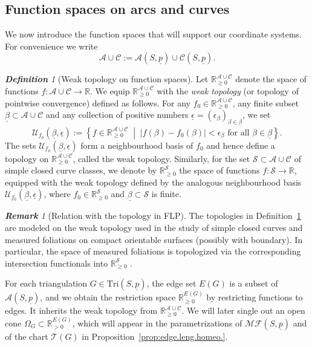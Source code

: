 \documentclass[11pt, letterpaper]{amsart}
\theoremstyle{definition}
\theoremstyle{remark}
\newtheorem{definition}[theorem]{\rm\bf Definition}
\newtheorem{remark}[theorem]{\rm\bf Remark}
\newcommand{\up}{\underline{p}}
\newcommand{\Sp}{(S,\up)}
\newcommand{\TSp}{\text{Tri}\Sp}
\newcommand{\cMFp}{\mathcal{MF} (S,\up)}
\newcommand{\cC}{\mathcal{C}}
\newcommand{\cA}{\mathcal{A}}
\newcommand{\cAC}{\mathcal{A} \cup \mathcal{C}}
\newcommand{\cT}{\mathcal{T}}
\newcommand{\cU}{\mathcal{U}}
\newcommand{\bR}{\mathbb{R}}
\newcommand{\bRn}{\mathbb{R}_{\geq 0}}
\newcommand{\bRp}{\mathbb{R}_{> 0}}
\newcommand{\cS}{\mathcal{S}}
\newcommand{\DEF}{} \newcommand{\WARN}{\textcolor{red}} \newcommand{\ALT}{\textcolor{brown}} \newcommand{\TODO}{\textcolor{teal}} %
\numberwithin{equation}{section}
\begin{document}
 
\subsection{Function spaces on arcs and curves}

We now introduce the function spaces that will support our coordinate systems.
For convenience we write
\[
  \cAC := \cA\Sp \cup \cC\Sp.
\]



\begin{definition}[Weak topology on function spaces]
\label{def:weak.top.func.space}
Let \(\bRn^{\cAC}\) denote the space of functions \(f \colon \cAC \to \bR\).
We equip \(\bRn^{\cAC}\) with the \DEF{\em weak topology} (or topology of pointwise convergence) defined as follows.
For any \(f_0 \in \bRn^{\cAC}\), any finite subset \(\underline{\beta} \subset \cAC\) and any collection of positive numbers \(\underline{\epsilon} = (\epsilon_{\beta})_{\beta \in \underline{\beta}}\), we set
\[
  \cU_{f_0}(\underline{\beta}, \underline{\epsilon})
  :=
  \left\{
    f \in \bRn^{\cAC}
    \;\middle|\;
    \lvert f(\beta) - f_0(\beta) \rvert < \epsilon_{\beta}
    \text{ for all } \beta \in \underline{\beta}
  \right\}.
\]
The sets \(\cU_{f_0}(\underline{\beta}, \underline{\epsilon})\) form a neighbourhood basis of \(f_0\) and hence define a topology on \(\bRn^{\cAC}\), called the weak topology.
Similarly, for the set \(\cS\subset \cAC\) of simple closed curve classes,  we denote by \(\bRn^{\cS}\) the space of functions \(f:\cS\to\bR\),
equipped with the weak topology defined by the analogous neighbourhood basis
\(\cU_{f_0}(\underline{\beta},\underline{\epsilon})\), where \(f_0\in\bR^{\cS}_{\geq 0}\) and \(\underline{\beta}\subset\cS\) is finite.
\end{definition}





\begin{remark}[Relation with the topology in FLP]
The topologies in Definition~\ref{def:weak.top.func.space} are modeled on the weak topology used in the study of simple closed curves and measured foliations on compact orientable surfaces (possibly with boundary). 
In particular, the space of measured foliations is topologized via the corresponding intersection functionals into \(\bRn^{\cS}\) \cite[Expos\'e~4]{FLP12}.
\end{remark}





For each triangulation \(G \in \TSp\), the edge set \(E(G)\) is a subset of \(\cA\Sp\), and we obtain the restriction space \(\bRn^{E(G)}\)  by restricting functions to edges. It inherits the weak topology from \(\bRn^{\cAC}\). 
We will later single out an open cone \(\Omega_G \subset \bRp^{E(G)}\), which will appear in the parametrizations of \(\cMFp\) and of the chart \(\cT(G)\) in Proposition~\ref{prop:edge.leng.homeo.}.
\end{document}
